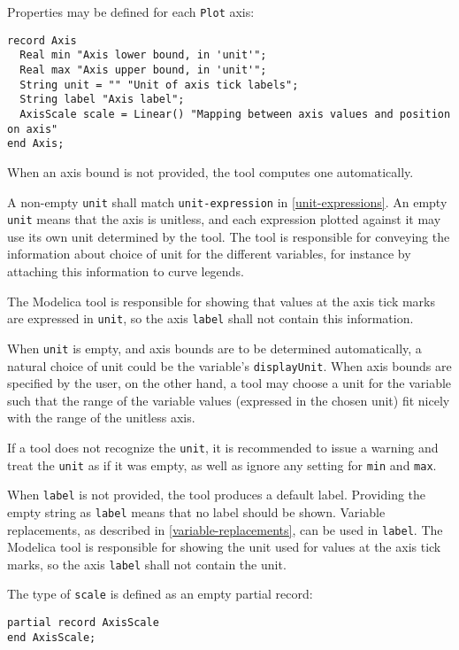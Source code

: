 Properties may be defined for each \lstinline!Plot! axis:
\begin{lstlisting}[language=modelica]
record Axis
  Real min "Axis lower bound, in 'unit'";
  Real max "Axis upper bound, in 'unit'";
  String unit = "" "Unit of axis tick labels";
  String label "Axis label";
  AxisScale scale = Linear() "Mapping between axis values and position on axis"
end Axis;
\end{lstlisting}

When an axis bound is not provided, the tool computes one automatically.

A non-empty \lstinline!unit! shall match \lstinline[language=grammar]!unit-expression! in \cref{unit-expressions}.
An empty \lstinline!unit! means that the axis is unitless, and each expression plotted against it may use its own unit determined by the tool.
The tool is responsible for conveying the information about choice of unit for the different variables, for instance by attaching this information to curve legends.

The Modelica tool is responsible for showing that values at the axis tick marks are expressed in \lstinline!unit!, so the axis \lstinline!label! shall not contain this information.

\begin{nonnormative}
When \lstinline!unit! is empty, and axis bounds are to be determined automatically, a natural choice of unit could be the variable's \lstinline!displayUnit!.
When axis bounds are specified by the user, on the other hand, a tool may choose a unit for the variable such that the range of the variable values (expressed in the chosen unit) fit nicely with the range of the unitless axis.
\end{nonnormative}

If a tool does not recognize the \lstinline!unit!, it is recommended to issue a warning and treat the \lstinline!unit! as if it was empty, as well as ignore any setting for \lstinline!min! and \lstinline!max!.

When \lstinline!label! is not provided, the tool produces a default label.
Providing the empty string as \lstinline!label! means that no label should be shown.
Variable replacements, as described in \cref{variable-replacements}, can be used in \lstinline!label!.
The Modelica tool is responsible for showing the unit used for values at the axis tick marks, so the axis \lstinline!label! shall not contain the unit.

The type of \lstinline!scale! is defined as an empty partial record:
\begin{lstlisting}[language=modelica]
partial record AxisScale
end AxisScale;
\end{lstlisting}%

